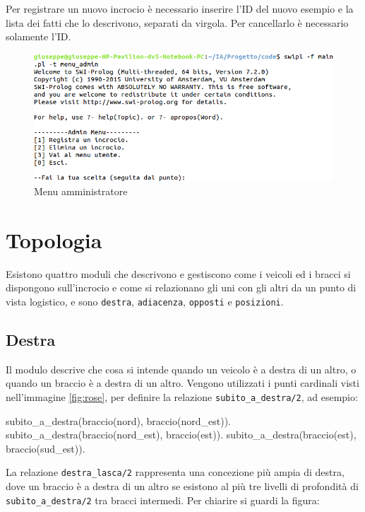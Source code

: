 Per registrare un nuovo incrocio è necessario inserire l'ID del nuovo esempio e la lista dei fatti che lo descrivono, separati da virgola. Per cancellarlo è necessario solamente l'ID.

\begin{figure}[!hbtp]
	\includegraphics[width=\textwidth]{images/admin}
	\caption{Menu amministratore}
\end{figure}

\section{Topologia}
Esistono quattro moduli che descrivono e gestiscono come i veicoli ed i bracci si dispongono sull'incrocio e come si relazionano gli uni con gli altri da un punto di vista logistico, e sono \texttt{destra}, \texttt{adiacenza}, \texttt{opposti} e \texttt{posizioni}.

\subsection{Destra}
Il modulo descrive che cosa si intende quando un veicolo è a destra di un altro, o quando un braccio è a destra di un altro. Vengono utilizzati i punti cardinali visti nell'immagine \ref{fig:rose}, per definire la relazione \texttt{subito\_a\_destra/2}, ad esempio:
\begin{verbatimtab}
subito_a_destra(braccio(nord), braccio(nord_est)).
subito_a_destra(braccio(nord_est), braccio(est)).
subito_a_destra(braccio(est), braccio(sud_est)).	
\end{verbatimtab}

La relazione \texttt{destra\_lasca/2} rappresenta una concezione più ampia di destra, dove un braccio è a destra di un altro se esistono al più tre livelli di profondità di \texttt{subito\_a\_destra/2} tra bracci intermedi. Per chiarire si guardi la figura:

